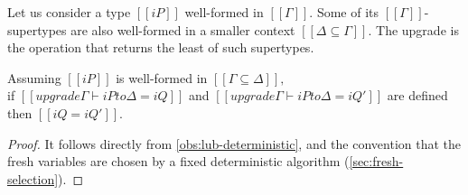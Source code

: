 Let us consider a type $[[iP]]$ well-formed in $[[Γ]]$.
Some of its $[[Γ]]$-supertypes are also well-formed in a smaller context $[[{Δ} ⊆ Γ]]$.
The upgrade is the operation that returns the least of such supertypes.

\begin{observation}
    \label{obs:upgrade-deterministic}
    Assuming $[[iP]]$ is well-formed in $[[Γ ⊆ Δ]],$\\
    if $[[upgrade Γ ⊢ iP to Δ = iQ]]$ and $[[upgrade Γ ⊢ iP to Δ = iQ']]$ are defined 
    then $[[iQ = iQ']]$.
\end{observation}
\begin{proof}
    It follows directly from \cref{obs:lub-deterministic},
    and the convention that the fresh variables are chosen by a fixed deterministic algorithm
    (\cref{sec:fresh-selection}).
\end{proof}

